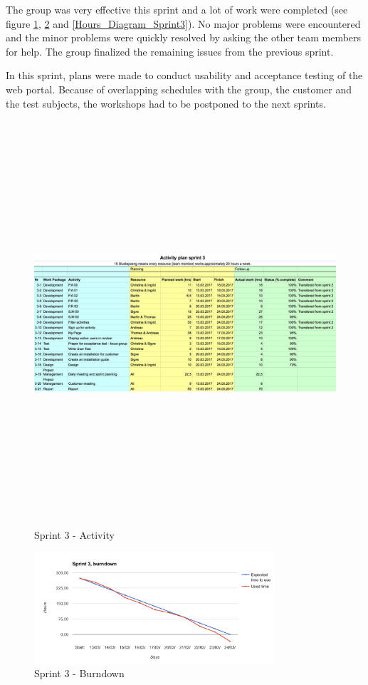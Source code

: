 The group was very effective this sprint and a lot of work were completed (see figure \ref{Activity_Plan}, \ref{Burndown_Sprint3} and \ref{Hours_Diagram_Sprint3}). No major problems were encountered and the minor problems were quickly resolved by asking the other team members for help. The group finalized the remaining issues from the previous sprint. 

In this sprint, plans were made to conduct usability and acceptance testing of the web portal. Because of overlapping schedules with the group, the customer and the test subjects, the workshops had to be postponed to the next sprints.

\begin{figure}[ht]
\centering
    \includegraphics[angle=90,height=150mm,width=\textwidth]{fig/activity_plan_3}
\caption{Sprint 3 - Activity}
\label{Activity_Plan}
\end{figure}

\begin{figure}[ht]
\centering
    \includegraphics[width=0.8\textwidth]{fig/sprint3}
\caption{Sprint 3 - Burndown}
\label{Burndown_Sprint3}
\end{figure}

